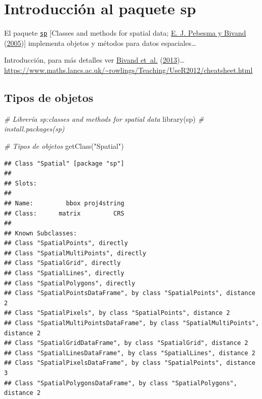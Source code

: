 \documentclass[
  spanish,
]{book}
\newenvironment{Shaded}{\begin{snugshade}}{\end{snugshade}}
\newcommand{\CommentTok}[1]{\textcolor[rgb]{0.56,0.35,0.01}{\textit{#1}}}
\newcommand{\FunctionTok}[1]{\textcolor[rgb]{0.00,0.00,0.00}{#1}}
\newcommand{\NormalTok}[1]{#1}
\newcommand{\StringTok}[1]{\textcolor[rgb]{0.31,0.60,0.02}{#1}}
\theoremstyle{break}
\theoremstyle{definition}
\theoremstyle{definition}
\theoremstyle{definition}
\theoremstyle{definition}
\theoremstyle{remark}
\begin{document}
\hypertarget{appendix-apendices}{%
\appendix}


\hypertarget{intro-sp}{%
\chapter{\texorpdfstring{Introducción al paquete \textbf{sp}}{Introducción al paquete sp}}\label{intro-sp}}

El paquete \href{https://CRAN.R-project.org/package=sp}{\texttt{sp}} {[}Classes and methods for spatial data; \protect\hyperlink{ref-Pebesma2005}{E. J. Pebesma y Bivand} (\protect\hyperlink{ref-Pebesma2005}{2005}){]} implementa objetos y métodos para datos espaciales\ldots{}

Introducción, para más detalles ver \protect\hyperlink{ref-Bivand2013}{Bivand et~al.} (\protect\hyperlink{ref-Bivand2013}{2013})\ldots{}
\url{https://www.maths.lancs.ac.uk/~rowlings/Teaching/UseR2012/cheatsheet.html}

\hypertarget{tipos-de-objetos}{%
\section{Tipos de objetos}\label{tipos-de-objetos}}

\begin{Shaded}
\begin{Highlighting}[]
\CommentTok{\# Librería sp:classes and methods for spatial data}
\FunctionTok{library}\NormalTok{(sp) }\CommentTok{\# install.packages(\textquotesingle{}sp\textquotesingle{})}

\CommentTok{\# Tipos de objetos}
\FunctionTok{getClass}\NormalTok{(}\StringTok{"Spatial"}\NormalTok{)}
\end{Highlighting}
\end{Shaded}

\begin{verbatim}
## Class "Spatial" [package "sp"]
## 
## Slots:
##                               
## Name:         bbox proj4string
## Class:      matrix         CRS
## 
## Known Subclasses: 
## Class "SpatialPoints", directly
## Class "SpatialMultiPoints", directly
## Class "SpatialGrid", directly
## Class "SpatialLines", directly
## Class "SpatialPolygons", directly
## Class "SpatialPointsDataFrame", by class "SpatialPoints", distance 2
## Class "SpatialPixels", by class "SpatialPoints", distance 2
## Class "SpatialMultiPointsDataFrame", by class "SpatialMultiPoints", distance 2
## Class "SpatialGridDataFrame", by class "SpatialGrid", distance 2
## Class "SpatialLinesDataFrame", by class "SpatialLines", distance 2
## Class "SpatialPixelsDataFrame", by class "SpatialPoints", distance 3
## Class "SpatialPolygonsDataFrame", by class "SpatialPolygons", distance 2
\end{verbatim}
\end{document}
